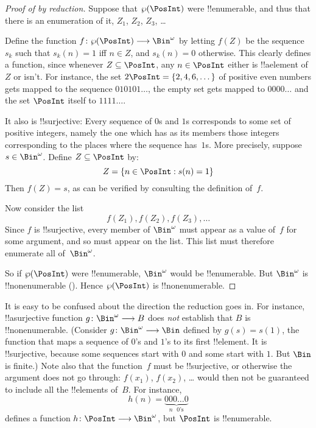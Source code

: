 \documentclass[../../../include/open-logic-section]{subfiles}
\begin{document}
\begin{proof}[Proof of {} by reduction]
Suppose that $\Pow{\PosInt}$ were !!{enumerable}, and thus that
there is an enumeration of it, $Z_{1}$, $Z_{2}$, $Z_{3}$, \dots

Define the function $f \colon \Pow{\PosInt} \to \Bin^\omega$ by letting
$f(Z)$ be the sequence $s_{k}$ such that $s_{k}(n) = 1$ iff $n \in Z$,
and $s_k(n) = 0$ otherwise.  This clearly defines a function, since
whenever $Z \subseteq \PosInt$, any $n \in \PosInt$ either is
!!a{element} of $Z$ or isn't.  For instance, the set $2\PosInt = \{2,
4, 6, \dots\}$ of positive even numbers gets mapped to the sequence
$010101\dots$, the empty set gets mapped to $0000\dots$ and the set
$\PosInt$ itself to $1111\dots$.

It also is !!{surjective}: Every sequence of $0$s and $1$s corresponds
to some set of positive integers, namely the one which has as its
members those integers corresponding to the places where the sequence
has~$1$s. More precisely, suppose $s \in \Bin^\omega$.  Define $Z
\subseteq \PosInt$ by:
\[
Z = \Setabs{n \in \PosInt}{s(n) = 1}
\]
Then $f(Z) = s$, as can be verified by consulting the definition
of~$f$.

Now consider the list
\[
f(Z_1), f(Z_2), f(Z_3), \dots
\]
Since $f$ is !!{surjective}, every member of $\Bin^\omega$ must
appear as a value of~$f$ for some argument, and so must appear on the
list. This list must therefore enumerate all of~$\Bin^\omega$.

So if $\Pow{\PosInt}$ were !!{enumerable}, $\Bin^\omega$ would be
!!{enumerable}.  But $\Bin^\omega$ is !!{nonenumerable}
(). Hence $\Pow{\PosInt}$ is
!!{nonenumerable}.
\end{proof}

\begin{explain}
It is easy to be confused about the direction the reduction goes in.
For instance, !!a{surjective} function $g \colon \Bin^\omega \to B$
does \emph{not} establish that $B$ is !!{nonenumerable}.  (Consider $g
\colon \Bin^\omega \to \Bin$ defined by $g(s) = s(1)$, the function
that maps a sequence of $0$'s and $1$'s to its first !!{element}.  It
is !!{surjective}, because some sequences start with $0$ and some start
with $1$. But $\Bin$ is finite.)  Note also that the function~$f$ must
be !!{surjective}, or otherwise the argument does not go through:
$f(x_1)$, $f(x_2)$, \dots{} would then not be guaranteed to include
all the !!{element}s of~$B$. For instance, 
\[
h(n) = \underbrace{000\dots0}_{\text{$n$ $0$'s}}
\]
defines a function $h\colon \PosInt \to
\Bin^\omega$, but $\PosInt$ is !!{enumerable}.
\end{explain}
\end{document}
